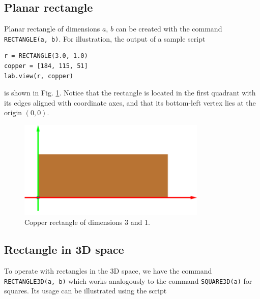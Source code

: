 \subsection{Planar rectangle}

\noindent
Planar rectangle of dimensions $a$, $b$ can be created with the 
command {\tt RECTANGLE(a, b)}. For illustration, the output of a sample script\\

\begin{bbox}
\begin{verbatim}
r = RECTANGLE(3.0, 1.0)
copper = [184, 115, 51]
lab.view(r, copper)
\end{verbatim}
\end{bbox}
\vspace{6mm}

\noindent
is shown in Fig. \ref{fig:cuboid-2}. Notice that the rectangle 
is located in the first quadrant with its edges 
aligned with coordinate axes, and that its bottom-left vertex lies at the 
origin $(0, 0)$.
\newpage

\begin{figure}[!ht]
\begin{center}
\includegraphics[width=0.8\textwidth]{img/cuboid-2.png}
\end{center}
\vspace{-6mm}
\caption{Copper rectangle of dimensions 3 and 1.}
\label{fig:cuboid-2}
\vspace{-1cm}
\end{figure}
\noindent

\subsection{Rectangle in 3D space}

To operate with rectangles in the 3D space, we have the command {\tt RECTANGLE3D(a, b)}
which works analogously to the command {\tt SQUARE3D(a)} for squares. Its usage
can be illustrated using the script \\

